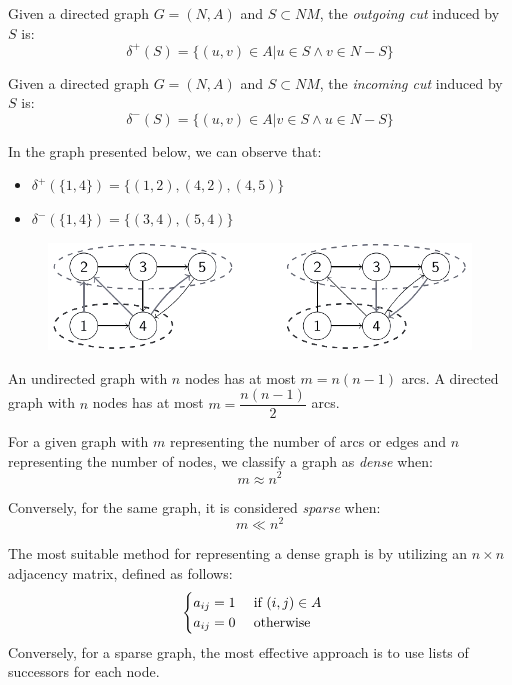 \documentclass[12pt, a4paper]{report}
\begin{document}
    \begin{definition}
        Given a directed graph $G=(N,A)$ and $S \subset NM$, the \emph{outgoing cut} induced by $S$ is:
        \[ \delta^{+}(S)=\{(u,v) \in A | u \in S \land v \in N-S \} \]

        Given a directed graph $G=(N,A)$ and $S \subset NM$, the \emph{incoming cut} induced by $S$ is:
        \[ \delta^{-}(S)=\{(u,v) \in A | v \in S \land u \in N-S \} \]
    \end{definition}
    \begin{example}
        In the graph presented below, we can observe that:
        \begin{itemize}
            \item $\delta^{+}(\{1,4\})=\{(1,2),(4,2),(4,5)\}$
            \item $\delta^{-}(\{1,4\})=\{(3,4),(5,4)\}$
        \end{itemize}
        \begin{figure}[H]
            \centering
            \includegraphics[width=0.75\linewidth]{images/cuts.png}
        \end{figure}
    \end{example}
    An undirected graph with $n$ nodes has at most $m=n(n-1)$ arcs. 
    A directed graph with $n$ nodes has at most $m=\dfrac{n(n-1)}{2}$ arcs.
    \newpage
    \begin{definition}
        For a given graph with $m$ representing the number of arcs or edges and $n$ representing the number of nodes, we classify a graph as \emph{dense} when:
        \[m \approx n^2\]

        Conversely, for the same graph, it is considered \emph{sparse} when:
        \[m \ll n^2\]
    \end{definition}
    The most suitable method for representing a dense graph is by utilizing an $n \times n$ adjacency matrix, defined as follows:
    \[
    \begin{cases}
        a_{ij}=1 \:\:\:\:\:\: \textnormal{if }(i,j) \in A \\
        a_{ij}=0 \:\:\:\:\:\: \textnormal{otherwise}    
    \end{cases}    
    \]
    Conversely, for a sparse graph, the most effective approach is to use lists of successors for each node.
\end{document}
